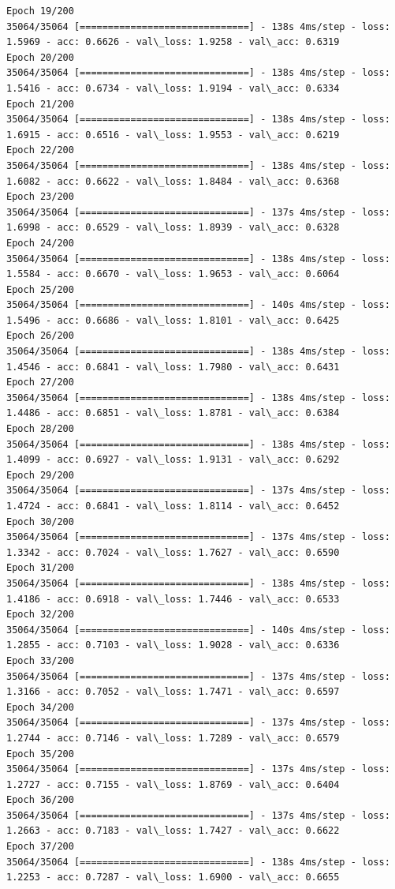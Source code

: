 \documentclass[11pt]{article}
\begin{document}
\begin{Verbatim}[commandchars=\\\{\}]
Epoch 19/200
35064/35064 [==============================] - 138s 4ms/step - loss: 1.5969 - acc: 0.6626 - val\_loss: 1.9258 - val\_acc: 0.6319
Epoch 20/200
35064/35064 [==============================] - 138s 4ms/step - loss: 1.5416 - acc: 0.6734 - val\_loss: 1.9194 - val\_acc: 0.6334
Epoch 21/200
35064/35064 [==============================] - 138s 4ms/step - loss: 1.6915 - acc: 0.6516 - val\_loss: 1.9553 - val\_acc: 0.6219
Epoch 22/200
35064/35064 [==============================] - 138s 4ms/step - loss: 1.6082 - acc: 0.6622 - val\_loss: 1.8484 - val\_acc: 0.6368
Epoch 23/200
35064/35064 [==============================] - 137s 4ms/step - loss: 1.6998 - acc: 0.6529 - val\_loss: 1.8939 - val\_acc: 0.6328
Epoch 24/200
35064/35064 [==============================] - 138s 4ms/step - loss: 1.5584 - acc: 0.6670 - val\_loss: 1.9653 - val\_acc: 0.6064
Epoch 25/200
35064/35064 [==============================] - 140s 4ms/step - loss: 1.5496 - acc: 0.6686 - val\_loss: 1.8101 - val\_acc: 0.6425
Epoch 26/200
35064/35064 [==============================] - 138s 4ms/step - loss: 1.4546 - acc: 0.6841 - val\_loss: 1.7980 - val\_acc: 0.6431
Epoch 27/200
35064/35064 [==============================] - 138s 4ms/step - loss: 1.4486 - acc: 0.6851 - val\_loss: 1.8781 - val\_acc: 0.6384
Epoch 28/200
35064/35064 [==============================] - 138s 4ms/step - loss: 1.4099 - acc: 0.6927 - val\_loss: 1.9131 - val\_acc: 0.6292
Epoch 29/200
35064/35064 [==============================] - 137s 4ms/step - loss: 1.4724 - acc: 0.6841 - val\_loss: 1.8114 - val\_acc: 0.6452
Epoch 30/200
35064/35064 [==============================] - 137s 4ms/step - loss: 1.3342 - acc: 0.7024 - val\_loss: 1.7627 - val\_acc: 0.6590
Epoch 31/200
35064/35064 [==============================] - 138s 4ms/step - loss: 1.4186 - acc: 0.6918 - val\_loss: 1.7446 - val\_acc: 0.6533
Epoch 32/200
35064/35064 [==============================] - 140s 4ms/step - loss: 1.2855 - acc: 0.7103 - val\_loss: 1.9028 - val\_acc: 0.6336
Epoch 33/200
35064/35064 [==============================] - 137s 4ms/step - loss: 1.3166 - acc: 0.7052 - val\_loss: 1.7471 - val\_acc: 0.6597
Epoch 34/200
35064/35064 [==============================] - 137s 4ms/step - loss: 1.2744 - acc: 0.7146 - val\_loss: 1.7289 - val\_acc: 0.6579
Epoch 35/200
35064/35064 [==============================] - 137s 4ms/step - loss: 1.2727 - acc: 0.7155 - val\_loss: 1.8769 - val\_acc: 0.6404
Epoch 36/200
35064/35064 [==============================] - 137s 4ms/step - loss: 1.2663 - acc: 0.7183 - val\_loss: 1.7427 - val\_acc: 0.6622
Epoch 37/200
35064/35064 [==============================] - 138s 4ms/step - loss: 1.2253 - acc: 0.7287 - val\_loss: 1.6900 - val\_acc: 0.6655

\end{Verbatim}
\end{document}
